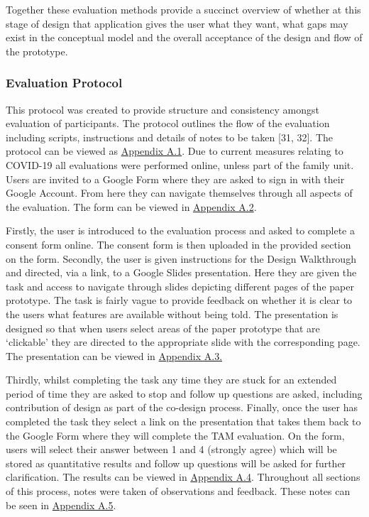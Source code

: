 \documentclass[a4 paper, 12pt]{article}
\begin{document}
Together these evaluation methods provide a succinct overview of whether at this stage of design that application gives the user what they want, what gaps may exist in the conceptual model and the overall acceptance of the design and flow of the prototype.

\subsubsection{Evaluation Protocol}
This protocol was created to provide structure and consistency amongst evaluation of participants. The protocol outlines the flow of the evaluation including scripts, instructions and details of notes to be taken [31, 32]. The protocol can be viewed as \hyperref[sec:A.1]{Appendix A.1}. Due to current measures relating to COVID-19 all evaluations were performed online, unless part of the family unit. Users are invited to a Google Form where they are asked to sign in with their Google Account. From here they can navigate themselves through all aspects of the evaluation. The form can be viewed in \hyperref[sec:A.2]{Appendix A.2}.  

Firstly, the user is introduced to the evaluation process and asked to complete a consent form online. The consent form is then uploaded in the provided section on the form. Secondly, the user is given instructions for the Design Walkthrough and directed, via a link, to a Google Slides presentation. Here they are given the task and access to navigate through slides depicting different pages of the paper prototype. The task is fairly vague to provide feedback on whether it is clear to the users what features are available without being told. The presentation is designed so that when users select areas of the paper prototype that are ‘clickable’ they are directed to the appropriate slide with the corresponding page. The presentation can be viewed in \hyperref[sec:A.3]{Appendix A.3.}

Thirdly, whilst completing the task any time they are stuck for an extended period of time they are asked to stop and follow up questions are asked, including contribution of design as part of the co-design process. Finally, once the user has completed the task they select a link on the presentation that takes them back to the Google Form where they will complete the TAM evaluation. On the form, users will select their answer between 1 and 4 (strongly agree) which will be stored as quantitative results and follow up questions will be asked for further clarification. The results can be viewed in \hyperref[sec:A.4]{Appendix A.4}. Throughout all sections of this process, notes were taken of observations and feedback. These notes can be seen in \hyperref[sec:A.5]{Appendix A.5}.
\end{document}
